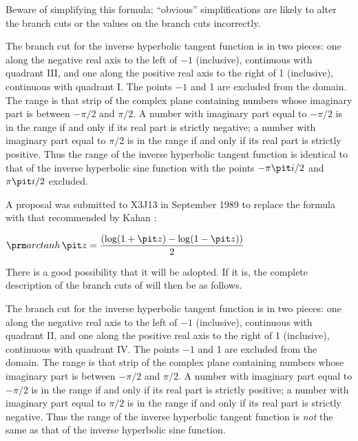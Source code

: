 \begin{flushdesc}
\begin{obsolete}
Beware of simplifying this formula; ``obvious'' simplifications are
likely to alter the branch cuts or the values on the branch cuts
incorrectly.

The branch cut for the inverse hyperbolic tangent function
is in two pieces: one along the negative real axis to the left of
$-1$ (inclusive), continuous with quadrant III, and one along
the positive real axis to the right of 1 (inclusive), continuous with
quadrant I.  The points $-1$ and 1 are excluded from the
domain.
The range is that strip of the complex plane containing
numbers whose imaginary part is between $-\pi/2$ and
$\pi/2$.  A number with imaginary part equal to $-\pi/2$
is in the range if and only if its real part is strictly negative; a number with
imaginary part equal to $\pi/2$ is in the range if and only if its real
part is strictly positive.  Thus the range of the inverse
hyperbolic tangent function is identical to
that of the inverse hyperbolic sine function with the points
$-\pi {\it i}/2$ and $\pi {\it i}/2$ excluded.
\end{obsolete}

\begin{newer}
A proposal was submitted to X3J13 in September 1989 to replace the
formula  with that recommended by Kahan \cite{KAHAN-COMPLEX-FNS}:
\begin{tabbing}
\( \displaystyle \arctanh {\it z}= { \left(\log(1+{\it z}) - \log(1-{\it z})\right) \over 2 } \)
\end{tabbing}
There is a good possibility that it will be adopted.  If it is, the complete
description of the branch cuts of  will then be as follows.

The branch cut for the inverse hyperbolic tangent function
is in two pieces: one along the negative real axis to the left of
$-1$ (inclusive), continuous with quadrant II, and one along
the positive real axis to the right of 1 (inclusive), continuous with
quadrant IV.  The points $-1$ and 1 are excluded from the
domain.
The range is that strip of the complex plane containing
numbers whose imaginary part is between $-\pi/2$ and
$\pi/2$.  A number with imaginary part equal to $-\pi/2$
is in the range if and only if its real part is strictly positive; a number with
imaginary part equal to $\pi/2$ is in the range if and only if its real
part is strictly negative.  Thus the range of the inverse
hyperbolic tangent function is {\it not} the same as
that of the inverse hyperbolic sine function.
\end{newer}
\end{flushdesc}

